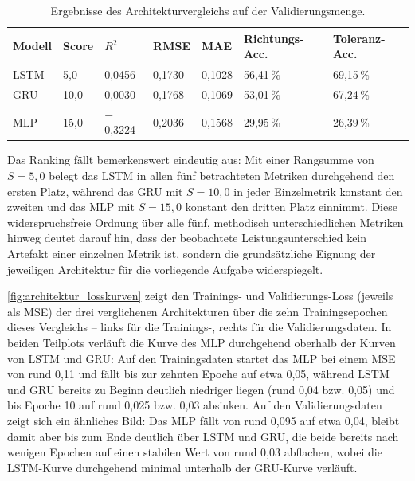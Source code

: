 \begin{table}[h]
    \centering
    \small
    \caption[Ergebnisse des Architekturvergleichs]{Ergebnisse des Architekturvergleichs auf der Validierungsmenge.}
    \label{tab:architektur_ergebnisse}
    \begin{tabularx}{\textwidth}{@{} l X X X X X X @{}}
        \toprule
        \textbf{Modell} & \textbf{Score} & \textbf{$R^2$} & \textbf{RMSE} & \textbf{MAE} & \textbf{Richtungs-Acc.} & \textbf{Toleranz-Acc.} \\
        \midrule
        LSTM & 5,0  & 0,0456   & 0,1730 & 0,1028 & 56,41\,\% & 69,15\,\% \\
        GRU  & 10,0 & 0,0030   & 0,1768 & 0,1069 & 53,01\,\% & 67,24\,\% \\
        MLP  & 15,0 & $-$0,3224 & 0,2036 & 0,1568 & 29,95\,\% & 26,39\,\% \\
        \bottomrule
    \end{tabularx}
\end{table}

Das Ranking fällt bemerkenswert eindeutig aus: Mit einer Rangsumme von $S=5{,}0$ belegt das \gls{LSTM} in allen fünf betrachteten Metriken durchgehend den ersten Platz, während das \gls{GRU} mit $S=10{,}0$ in jeder Einzelmetrik konstant den zweiten und das \gls{MLP} mit $S=15{,}0$ konstant den dritten Platz einnimmt. Diese widerspruchsfreie Ordnung über alle fünf, methodisch unterschiedlichen Metriken hinweg deutet darauf hin, dass der beobachtete Leistungsunterschied kein Artefakt einer einzelnen Metrik ist, sondern die grundsätzliche Eignung der jeweiligen Architektur für die vorliegende Aufgabe widerspiegelt.

\autoref{fig:architektur_losskurven} zeigt den Trainings- und Validierungs-Loss (jeweils als \gls{MSE}) der drei verglichenen Architekturen über die zehn Trainingsepochen dieses Vergleichs -- links für die Trainings-, rechts für die Validierungsdaten. In beiden Teilplots verläuft die Kurve des MLP durchgehend oberhalb der Kurven von LSTM und GRU: Auf den Trainingsdaten startet das MLP bei einem MSE von rund 0,11 und fällt bis zur zehnten Epoche auf etwa 0,05, während LSTM und GRU bereits zu Beginn deutlich niedriger liegen (rund 0,04 bzw. 0,05) und bis Epoche 10 auf rund 0,025 bzw. 0,03 absinken. Auf den Validierungsdaten zeigt sich ein ähnliches Bild: Das MLP fällt von rund 0,095 auf etwa 0,04, bleibt damit aber bis zum Ende deutlich über LSTM und GRU, die beide bereits nach wenigen Epochen auf einen stabilen Wert von rund 0,03 abflachen, wobei die LSTM-Kurve durchgehend minimal unterhalb der GRU-Kurve verläuft.

